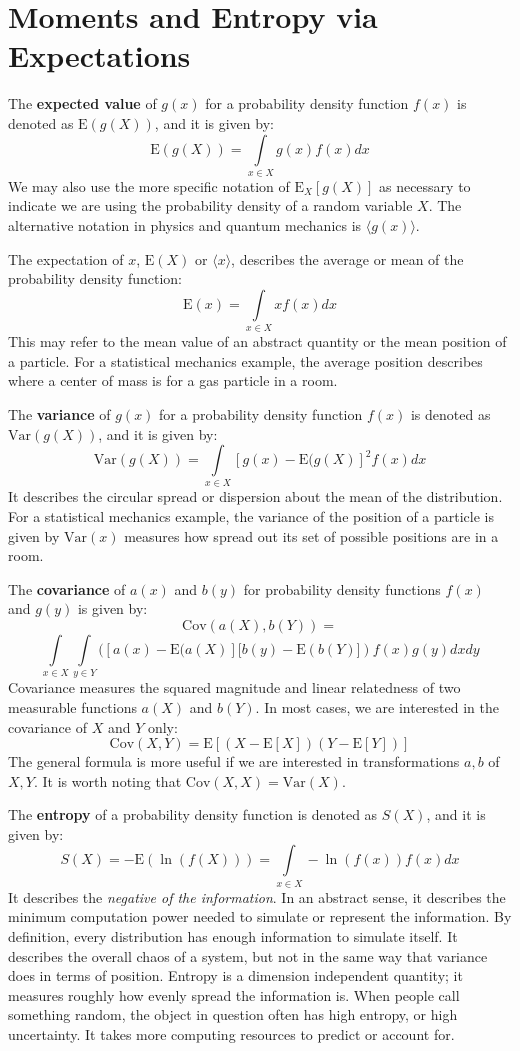 \documentclass[10pt, a5paper, twoside, openright]{memoir}
\begin{document}
\section{Moments and Entropy via Expectations}
The \textbf{expected value} of $g(x)$ for a probability density function $f(x)$ is denoted as $\mathrm{E}(g(X))$, and it is given by:
$$\mathrm{E}(g(X)) = \int\limits_{x \in X} g(x) f(x) dx$$
We may also use the more specific notation of $\mathrm{E}_X[g(X)]$ as necessary to indicate we are using the probability density of a random variable $X$. The alternative notation in physics and quantum mechanics is $\langle g(x) \rangle$. 

The expectation of $x$, $\mathrm{E}(X)$ or $\langle x \rangle$, describes the average or mean of the probability density function:
$$\mathrm{E}(x) = \int\limits_{x \in X} x f(x) dx$$
This may refer to the mean value of an abstract quantity or the mean position of a particle. For a statistical mechanics example, the average position describes where a center of mass is for a gas particle in a room.

The \textbf{variance} of $g(x)$ for a probability density function $f(x)$ is denoted as $\mathrm{Var}(g(X))$, and it is given by:
$$\mathrm{Var}(g(X)) = \int\limits_{x \in X} [g(x)-\mathrm{E}(g(X)]^2 f(x) dx$$
It describes the circular spread or dispersion about the mean of the distribution. For a statistical mechanics example, the variance of the position of a particle is given by $\mathrm{Var}(x)$ measures how spread out its set of possible positions are in a room.

The \textbf{covariance} of $a(x)$ and $b(y)$ for probability density functions $f(x)$ and $g(y)$ is given by:
$$\mathrm{Cov}(a(X),b(Y)) = $$
$$\int\limits_{x \in X} \int\limits_{y \in Y} ([a(x)-\mathrm{E}(a(X)][b(y)-\mathrm{E}(b(Y)]) f(x) g(y) dx dy$$
Covariance measures the squared magnitude and linear relatedness of two measurable functions $a(X)$ and $b(Y)$. In most cases, we are interested in the covariance of $X$ and $Y$ only:
$$\mathrm{Cov}(X,Y) = \mathrm{E}[(X-\mathrm{E}[X])(Y-\mathrm{E}[Y])]$$
The general formula is more useful if we are interested in transformations $a, b$ of $X,Y$. It is worth noting that $\mathrm{Cov}(X,X) = \mathrm{Var}(X)$.

The \textbf{entropy} of a probability density function is denoted as $S(X)$, and it is given by:
$$S(X) = -\mathrm{E}(\ln(f(X))) = \int\limits_{x \in X} -\ln(f(x)) f(x)dx$$
It describes the \textit{negative of the information}. In an abstract sense, it describes the minimum computation power needed to simulate or represent the information. By definition, every distribution has enough information to simulate itself. It describes the overall chaos of a system, but not in the same way that variance does in terms of position. Entropy is a dimension independent quantity; it measures roughly how evenly spread the information is. When people call something random, the object in question often has high entropy, or high uncertainty. It takes more computing resources to predict or account for.
\end{document}
